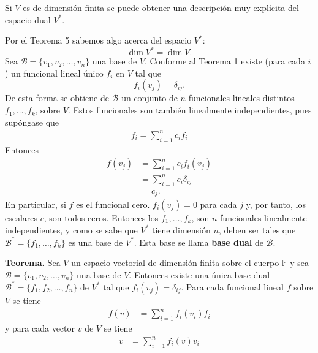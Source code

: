 \newpage

Si $V$ es de dimensión finita se puede obtener una descripción
muy explícita del espacio dual $V^{\ast}$.

Por el Teorema 5 sabemos algo acerca del espacio $V^{\ast}$:
$$\dim V^{\ast} = \dim V.$$
Sea $\mathcal{B} = \{v_1,v_2,\dots, v_n\}$ una base de $V$.
Conforme al Teorema 1 existe (para cada $i$) un funcional
lineal único $f_i$ en $V$ tal que $$f_i(v_j)=\delta_{ij}.$$
De esta forma se obtiene de $\mathcal{B}$ un conjunto de $n$
funcionales lineales distintos $f_1,\dots , f_k$, sobre $V$.
Estos funcionales son también linealmente independientes,
pues supóngase que
\begin{align*}
    f_i = \displaystyle{\sum_{i=1}^{n}}c_if_i
\end{align*}
Entonces
\begin{align*}
    f(v_j) &= \displaystyle{\sum_{i=1}^{n}}c_if_i(v_j)\\
           &= \displaystyle{\sum_{i=1}^{n}}c_i\delta_{ij}\\
           &= c_j.
\end{align*}
En particular, si $f$ es el funcional cero. $f_i(v_j) = 0$ para
cada $j$ y, por tanto, los escalares $c$, son todos ceros.
Entonces los $f_1,\dots, f_k$, son $n$ funcionales linealmente
independientes, y como se sabe que $V^{\ast}$ tiene dimensión $n$,
deben ser tales que $\mathcal{B}^{\ast} = \{f_1,\dots, f_k\}$
es una base de $V^{\ast}$.
Esta base se llama \textbf{base dual} de $\mathcal{B}$.

\textbf{Teorema.} Sea $V$ un espacio vectorial de dimensión
finita sobre el cuerpo $\mathbb{F}$ y sea $\mathcal{B} =
\{v_1,v_2,\dots,v_n\}$ una base de $V$. Entonces existe una
única base dual $\mathcal{B}^{\ast} = \{f_1,f_2,\dots,f_n\}$
de $V^{\ast}$ tal que $f_i(v_j) = \delta_{ij}$. Para cada
funcional lineal $f$ sobre $V$ se tiene
\begin{align*}
    f(v) &= \displaystyle{\sum_{i=1}^{n}}f_i(v_i)f_i
\end{align*}
y para cada vector $v$ de $V$ se tiene
\begin{align*}
    v &= \displaystyle{\sum_{i=1}^{n}}f_i(v)v_i
\end{align*}